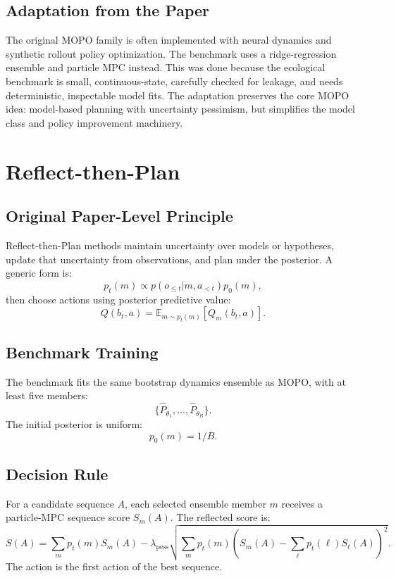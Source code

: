 \documentclass[11pt]{article}
\newcommand{\E}{\mathbb{E}}
\newcommand{\1}{\mathbf{1}}
\begin{document}
\subsection{Adaptation from the Paper}

The original MOPO family is often implemented with neural dynamics and synthetic
rollout policy optimization.  The benchmark uses a ridge-regression ensemble and
particle MPC instead.  This was done because the ecological benchmark is small,
continuous-state, carefully checked for leakage, and needs deterministic,
inspectable model fits.  The adaptation preserves the core MOPO idea:
model-based planning with uncertainty pessimism, but simplifies the model class
and policy improvement machinery.

\section{Reflect-then-Plan}

\subsection{Original Paper-Level Principle}

Reflect-then-Plan methods maintain uncertainty over models or hypotheses,
update that uncertainty from observations, and plan under the posterior.  A
generic form is:
\[
  p_t(m)\propto p(o_{\le t}|m,a_{<t})p_0(m),
\]
then choose actions using posterior predictive value:
\[
  Q(b_t,a)=\E_{m\sim p_t(m)}[Q_m(b_t,a)].
\]

\subsection{Benchmark Training}

The benchmark fits the same bootstrap dynamics ensemble as MOPO, with at least
five members:
\[
  \{\hat{P}_{\theta_1},\ldots,\hat{P}_{\theta_B}\}.
\]
The initial posterior is uniform:
\[
  p_0(m)=1/B.
\]

\subsection{Decision Rule}

For a candidate sequence $A$, each selected ensemble member $m$ receives a
particle-MPC sequence score $S_m(A)$.  The reflected score is:
\[
  S(A)
  =
  \sum_m p_t(m)S_m(A)
  -
  \lambda_{\mathrm{pess}}
  \sqrt{\sum_m p_t(m)\left(S_m(A)-\sum_\ell p_t(\ell)S_\ell(A)\right)^2}.
\]
The action is the first action of the best sequence.
\end{document}
